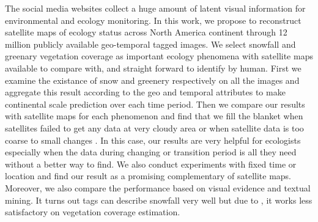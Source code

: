 \documentclass[10pt]{article}
\begin{document}
The  social media websites 
collect a huge amount of latent visual information for environmental and ecology monitoring.
In this work, we propose to reconstruct satellite maps of ecology status 
across North America continent 
through 12 million publicly available geo-temporal tagged images.
We select snowfall and greenary vegetation coverage as important ecology phenomena with satellite 
maps available to compare with, and straight forward  to identify by human. 
First we examine the existance of snow and greenery respectively on all the images and 
aggregate this result according to the geo and 
temporal attributes to make continental scale prediction over each time period. 
Then we compare our results with satellite maps for each phenomenon and find that we fill the blanket 
when satellites failed to get any data at very cloudy area or when satellite data is too 
coarse to small changes . In this case, our results are very helpful for ecologists especially when 
the data during changing or transition period is all they need without a better way to find. 
We also conduct experiments with fixed time or location and find our result 
as a promising complementary of satellite maps. Moreover, we also compare the performance based on visual evidence and textual mining. 
It turns out tags can describe snowfall very well but due to , it works less satisfactory on vegetation coverage estimation.
\end{document}
